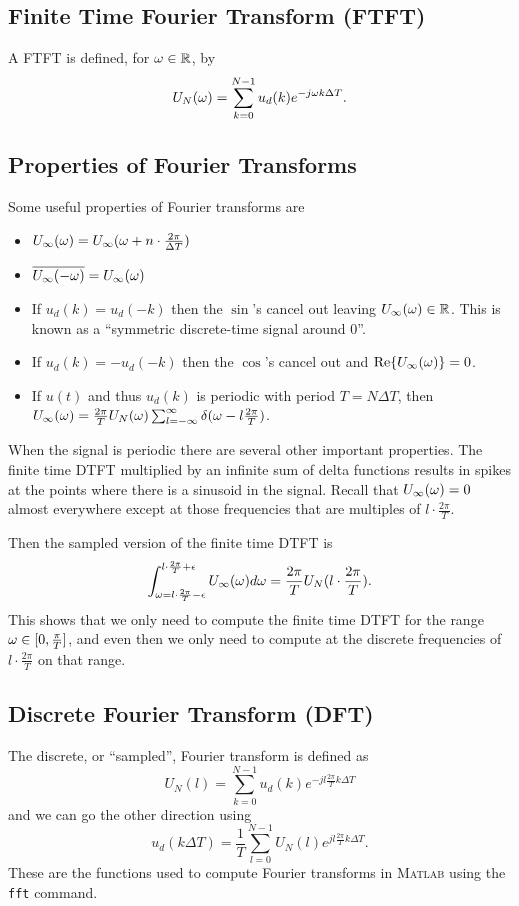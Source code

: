 \subsection{Finite Time Fourier Transform (FTFT)}
A FTFT is defined, for $\omega\in\mathbb{R}$, by
$$U_N(\omega) = \sum_{k=0}^{N-1} u_d(k) e^{-j\omega k\Delta T}.$$

\subsection{Properties of Fourier Transforms}
Some useful properties of Fourier transforms are
\begin{itemize}
\item $U_\infty(\omega) = U_\infty(\omega + n\cdot \frac{2\pi}{\Delta T})$
\item $\overline{U_\infty(-\omega)} = U_\infty(\omega)$
\item If $u_d(k) = u_d(-k)$ then the $\sin$'s cancel out leaving $U_\infty(\omega)\in\mathbb{R}$. This is known as a ``symmetric discrete-time signal around $0$''.
\item If $u_d(k) = -u_d(-k)$ then the $\cos$'s cancel out and $\text{Re}\lbrace U_\infty(\omega)\rbrace = 0$.
\item If $u(t)$ and thus $u_d(k)$ is periodic with period $T=N\Delta T$, then $U_\infty(\omega) = \frac{2\pi}{T}U_N(\omega) \sum_{l=-\infty}^\infty \delta(\omega-l\frac{2\pi}{T})$.
\end{itemize}
When the signal is periodic there are several other important properties. The finite time DTFT multiplied by an infinite sum of delta functions results in spikes at the points where there is a sinusoid in the signal. Recall that $U_\infty(\omega)=0$ almost everywhere except at those frequencies that are multiples of $l\cdot \frac{2\pi}{T}$.

Then the sampled version of the finite time DTFT is
$$\int_{\omega=l\cdot \frac{2\pi}{T}-\epsilon}^{l\cdot \frac{2\pi}{T}+\epsilon} U_\infty(\omega)d\omega
= \frac{2\pi}{T}U_N(l\cdot \frac{2\pi}{T}).$$
This shows that we only need to compute the finite time DTFT for the range $\omega\in[0,\frac{\pi}{T}]$, and even then we only need to compute at the discrete frequencies of $l\cdot\frac{2\pi}{T}$ on that range.

\subsection{Discrete Fourier Transform (DFT)}
The discrete, or ``sampled'', Fourier transform is defined as
$$U_N(l) = \sum_{k=0}^{N-1} u_d(k) e^{-jl\frac{2\pi}{T}k\Delta T}$$
and we can go the other direction using
$$u_d(k\Delta T) = \frac{1}{T} \sum_{l=0}^{N-1} U_N(l) e^{jl\frac{2\pi}{T}k\Delta T}.$$
These are the functions used to compute Fourier transforms in \textsc{Matlab} using the \texttt{fft} command.

